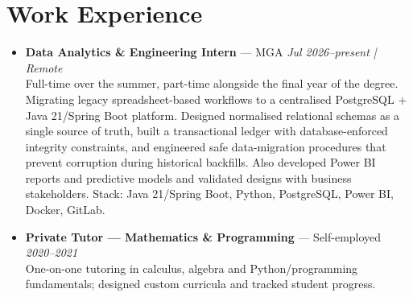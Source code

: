 \documentclass[10pt,a4paper]{article}
\begin{document}
\section{Work Experience}
{\small
\begin{itemize}

  \item \textbf{Data Analytics \& Engineering Intern} --- MGA \hfill \textit{Jul 2026--present | Remote}\\
  Full-time over the summer, part-time alongside the final year of the degree. Migrating legacy spreadsheet-based workflows to a centralised PostgreSQL + Java 21/Spring Boot platform.
  Designed normalised relational schemas as a single source of truth, built a transactional ledger with
  database-enforced integrity constraints, and engineered safe data-migration procedures that prevent
  corruption during historical backfills. Also developed Power BI reports and predictive models and validated
  designs with business stakeholders. Stack: Java 21/Spring Boot, Python, PostgreSQL, Power BI, Docker, GitLab.

  \item \textbf{Private Tutor --- Mathematics \& Programming} --- Self-employed \hfill \textit{2020--2021}\\
  One-on-one tutoring in calculus, algebra and Python/programming fundamentals;
  designed custom curricula and tracked student progress.

\end{itemize}
}

\end{document}
